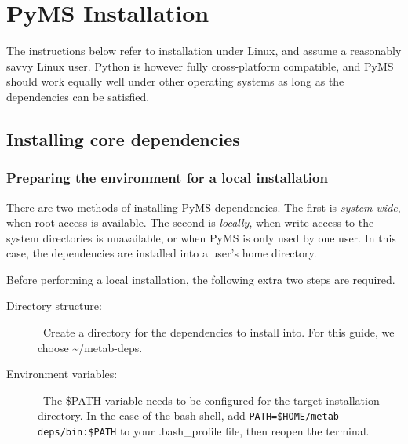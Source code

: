 

\chapter{PyMS Installation}

The instructions below refer to installation under Linux, and assume
a reasonably savvy Linux user.  Python is however fully cross-platform
compatible, and PyMS should work equally well under other operating
systems as long as the dependencies can be satisfied.

\section{Installing core dependencies}

\subsection{Preparing the environment for a local installation}

There are two methods of installing PyMS dependencies. The first is
{\it system-wide}, when root access is available. The second is {\it locally},
when write access to the system directories is unavailable, or when PyMS is
only used by one user. In this case, the dependencies are installed into a
user's home directory.

Before performing a local installation, the following extra two steps are
required.

\begin{description}
  \item [Directory structure:] \
        Create a directory for the dependencies to install into. For this
        guide, we choose \~{}/metab-deps.
  \item [Environment variables:] \
        The \$PATH variable needs to be configured for the target installation
        directory. In the case of the bash shell, add
        {\tt PATH=\$HOME/metab-deps/bin:\$PATH} to your .bash\_profile file,
        then reopen the terminal.
\end{description}

